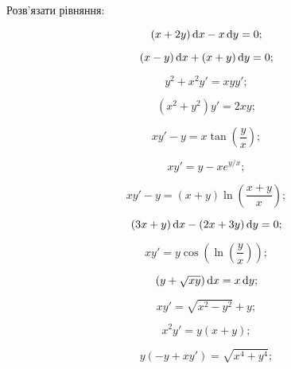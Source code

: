 Розв'язати рівняння:
\begin{multicols}{2}
	\begin{problem}
		\[ (x + 2 y) \mathop{}\!\mathrm{d} x - x \mathop{}\!\mathrm{d} y = 0; \]
	\end{problem}

	\begin{problem}
		\[ (x - y) \mathop{}\!\mathrm{d} x + (x + y) \mathop{}\!\mathrm{d} y = 0; \]
	\end{problem}
	
	\begin{problem}
		\[y^2 + x^2 y' = x y y'; \]
	\end{problem}
	
	\begin{problem}
		\[ (x^2 + y^2) y' = 2 x y; \]
	\end{problem}
	
	\begin{problem}
		\[ x y' - y = x \tan \left( \frac{y}{x} \right); \]
	\end{problem}
	
	\begin{problem}
		\[ x y' = y - x e^{y / x}; \]
	\end{problem}
	
	\begin{problem}
		\[x y' - y = (x + y) \ln \left( \frac{x + y}{x} \right); \]
	\end{problem}
	
	\begin{problem}
		\[ (3 x + y) \mathop{}\!\mathrm{d} x - (2 x + 3 y) \mathop{}\!\mathrm{d} y = 0; \]
	\end{problem}
	
	\begin{problem}
		\[ x y' = y \cos \left(\ln \left(\frac{y}{x} \right)\right); \]
	\end{problem}
	
	\begin{problem}
		\[ \left(y + \sqrt{x y}\right) \mathop{}\!\mathrm{d} x = x \mathop{}\!\mathrm{d} y; \]
	\end{problem}
	
	\begin{problem}
		\[ x y' = \sqrt{x^2 - y^2} + y; \]
	\end{problem}
	
	\begin{problem}
		\[ x^2 y' = y (x + y); \]
	\end{problem}
	
	\begin{problem}
		\[ y (-y + x y') = \sqrt{x^4 + y^4}; \]
	\end{problem}
	

\end{multicols}
